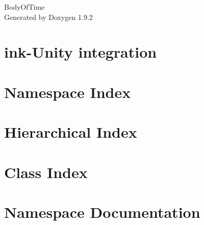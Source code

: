 \documentclass[twoside]{book}
\newcommand{\+}{\discretionary{\mbox{\scriptsize$\hookleftarrow$}}{}{}}
\newcommand{\clearemptydoublepage}{%
    \newpage{\pagestyle{empty}\cleardoublepage}%
  }
\begin{document}
  \raggedbottom
    \hypersetup{pageanchor=false,
                bookmarksnumbered=true,
                pdfencoding=unicode
               }
  \begin{titlepage}
  \vspace*{7cm}
  \begin{center}%
  {\Large Body\+Of\+Time}\\
  \vspace*{1cm}
  {\large Generated by Doxygen 1.9.2}\\
  \end{center}
  \end{titlepage}
  \clearemptydoublepage
  \tableofcontents
  \clearemptydoublepage
  \hypersetup{pageanchor=true}
\chapter{ink-\/\+Unity integration}
\label{md__d___repos__vertical_slice__assets__ink__r_e_a_d_m_e}

\chapter{Namespace Index}

\chapter{Hierarchical Index}

\chapter{Class Index}

\chapter{Namespace Documentation}













\end{document}
